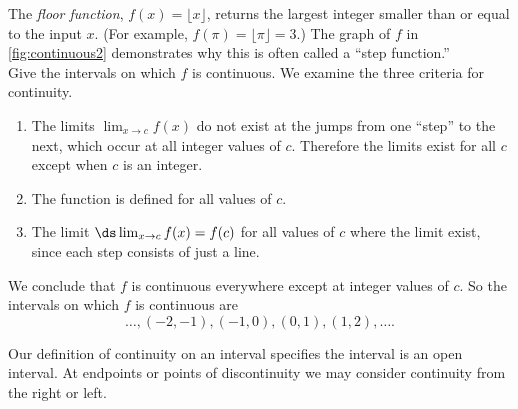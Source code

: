 
\begin{example}\label{ex_contint2}%
The \emph{floor function},
$f(x) = \lfloor x \rfloor$, returns the largest integer smaller than or equal to the input $x$. (For example, $f(\pi) = \lfloor \pi \rfloor = 3$.) The graph of $f$ in \autoref{fig:continuous2} demonstrates why this is often called a ``step function.'' \\
Give the intervals on which $f$ is continuous.
\solution
We examine the three criteria for continuity.
\begin{enumerate}
	\item	The limits $\lim_{x\to c} f(x)$ do not exist at the jumps from one ``step'' to the next, which occur at all integer values of $c$. Therefore the limits exist for all $c$ except when $c$ is an integer.
	\item	The function is defined for all values of $c$.
	\item	The limit $\ds \lim_{x\to c} f(x) = f(c)$ for all values of $c$ where the limit exist, since each step consists of just a line. 
\end{enumerate}
We conclude that $f$ is continuous everywhere except at integer values of $c$. So the intervals on which $f$ is continuous are
\[\dotsc, (-2,-1), (-1,0), (0,1), (1,2), \dotsc.\]
\end{example}

Our definition of continuity on an interval specifies the interval is an open interval. At endpoints or points of discontinuity we may consider continuity from the right or left.


